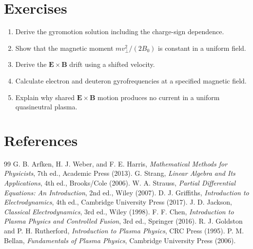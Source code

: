 \documentclass[11pt]{article}
\begin{document}
\section{Exercises}
\begin{enumerate}[leftmargin=1.8em]
\item Derive the gyromotion solution including the charge-sign dependence.
\item Show that the magnetic moment $mv_\perp^2/(2B_0)$ is constant in a uniform field.
\item Derive the $\mathbf E\times\mathbf B$ drift using a shifted velocity.
\item Calculate electron and deuteron gyrofrequencies at a specified magnetic field.
\item Explain why shared $\mathbf E\times\mathbf B$ motion produces no current in a uniform quasineutral plasma.
\end{enumerate}

\section{References}
\begin{thebibliography}{99}
 G. B. Arfken, H. J. Weber, and F. E. Harris, \emph{Mathematical Methods for Physicists}, 7th ed., Academic Press (2013).
 G. Strang, \emph{Linear Algebra and Its Applications}, 4th ed., Brooks/Cole (2006).
 W. A. Strauss, \emph{Partial Differential Equations: An Introduction}, 2nd ed., Wiley (2007).
 D. J. Griffiths, \emph{Introduction to Electrodynamics}, 4th ed., Cambridge University Press (2017).
 J. D. Jackson, \emph{Classical Electrodynamics}, 3rd ed., Wiley (1998).
 F. F. Chen, \emph{Introduction to Plasma Physics and Controlled Fusion}, 3rd ed., Springer (2016).
 R. J. Goldston and P. H. Rutherford, \emph{Introduction to Plasma Physics}, CRC Press (1995).
 P. M. Bellan, \emph{Fundamentals of Plasma Physics}, Cambridge University Press (2006).
\end{thebibliography}
\end{document}

